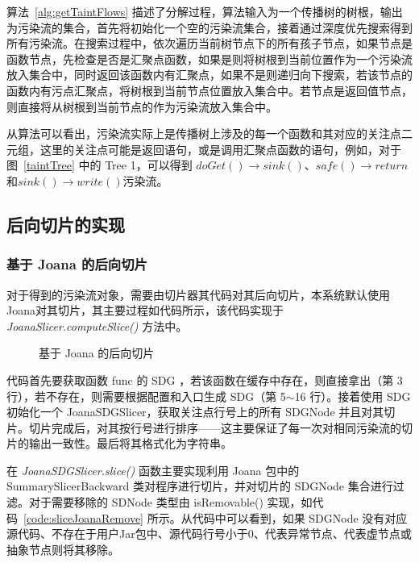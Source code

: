 算法~\ref{alg:getTaintFlows} 描述了分解过程，算法输入为一个传播树的树根，输出为污染流的集合，首先将初始化一个空的污染流集合，接着通过深度优先搜索得到所有污染流。在搜索过程中，依次遍历当前树节点下的所有孩子节点，如果节点是函数节点，先检查是否是汇聚点函数，如果是则将树根到当前位置作为一个污染流放入集合中，同时返回该函数内有汇聚点，如果不是则递归向下搜索，若该节点的函数内有污点汇聚点，将树根到当前节点位置放入集合中。若节点是返回值节点，则直接将从树根到当前节点的作为污染流放入集合中。

从算法可以看出，污染流实际上是传播树上涉及的每一个函数和其对应的关注点二元组，这里的关注点可能是返回语句，或是调用汇聚点函数的语句，例如，对于图~\ref{taintTree} 中的 Tree 1，可以得到 $doGet() \rightarrow sink()$、$safe() \rightarrow return$和$sink() \rightarrow write()$污染流。\\

\subsection{后向切片的实现}
\subsubsection{基于 Joana 的后向切片}
对于得到的污染流对象，需要由切片器其代码对其后向切片，本系统默认使用Joana对其切片，其主要过程如代码所示，该代码实现于 \textit{JoanaSlicer.computeSlice()} 方法中。

%    

\begin{figure}[!htbp]
    \noindent
    \centering
    \begin{minipage}{0.9\textwidth}
        
    \end{minipage}
\caption{基于 Joana 的后向切片}\label{code:sliceJoana}
\end{figure}

代码首先要获取函数 func 的 SDG ，若该函数在缓存中存在，则直接拿出（第 3 行），若不存在，则需要根据配置和入口生成 SDG（第 5$\sim$16 行）。接着使用 SDG 初始化一个 JoanaSDGSlicer，获取关注点行号上的所有 SDGNode 并且对其切片。切片完成后，对其按行号进行排序——这主要保证了每一次对相同污染流的切片的输出一致性。最后将其格式化为字符串。

在 \textit{JoanaSDGSlicer.slice()} 函数主要实现利用 Joana 包中的 SummarySlicerBackward 类对程序进行切片，并对切片的 SDGNode 集合进行过滤。对于需要移除的 SDNode 类型由 isRemovable() 实现，如代码~\ref{code:sliceJoanaRemove} 所示。从代码中可以看到，如果 SDGNode 没有对应源代码、不存在于用户Jar包中、源代码行号小于0、代表异常节点、代表虚节点或抽象节点则将其移除。

